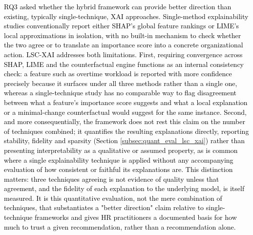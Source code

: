 \documentclass[a4paper,fleqn]{cas-sc}
\begin{document}
\textcolor{black}{RQ3 asked whether the hybrid framework can provide better direction than existing, typically single-technique, XAI approaches. Single-method explainability studies conventionally report either SHAP's global feature rankings or LIME's local approximations in isolation, with no built-in mechanism to check whether the two agree or to translate an importance score into a concrete organizational action. LSC-XAI addresses both limitations. First, requiring convergence across SHAP, LIME and the counterfactual engine functions as an internal consistency check: a feature such as overtime workload is reported with more confidence precisely because it surfaces under all three methods rather than a single one, whereas a single-technique study has no comparable way to flag disagreement between what a feature's importance score suggests and what a local explanation or a minimal-change counterfactual would suggest for the same instance. Second, and more consequentially, the framework does not rest this claim on the number of techniques combined; it quantifies the resulting explanations directly, reporting stability, fidelity and sparsity (Section \ref{subsec:quant_eval_lsc_xai}) rather than presenting interpretability as a qualitative or assumed property, as is common where a single explainability technique is applied without any accompanying evaluation of how consistent or faithful its explanations are. This distinction matters: three techniques agreeing is not evidence of quality unless that agreement, and the fidelity of each explanation to the underlying model, is itself measured. It is this quantitative evaluation, not the mere combination of techniques, that substantiates a "better direction" claim relative to single-technique frameworks and gives HR practitioners a documented basis for how much to trust a given recommendation, rather than a recommendation alone.}
\end{document}
